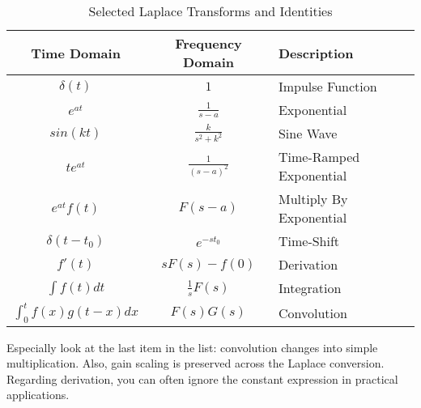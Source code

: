 \begin{table}[h]
\centering
\begin{tabular}{c|c|l}
Time Domain & Frequency Domain & Description \\
\hline
$\delta (t)$ & $1$ & Impulse Function\\
$e^{at}$ & $\frac{1}{s-a}$ & Exponential \\
$sin(kt)$ & $\frac{k}{s^2+k^2}$ & Sine Wave\\
$te^{at}$ & $\frac{1}{(s-a)^2}$ & Time-Ramped Exponential\\
$e^{at}f(t)$ & $F(s-a)$ & Multiply By Exponential\\
$\delta(t-t_0)$ & $e^{-st_0}$ & Time-Shift\\
$f'(t)$ & $sF(s) - f(0)$ & Derivation\\
$\int f(t)dt$ & $\frac{1}{s}F(s)$ & Integration\\
$\int^t_0 f(x)g(t-x)dx$ & $F(s)G(s)$ & Convolution\\

\end{tabular}
\caption{Selected Laplace Transforms and Identities}\label{laplace_list}
\end{table}

Especially look at the last item in the list: convolution changes into simple multiplication. Also, gain scaling is preserved across the Laplace conversion. Regarding derivation, you can often ignore the constant expression in practical applications.